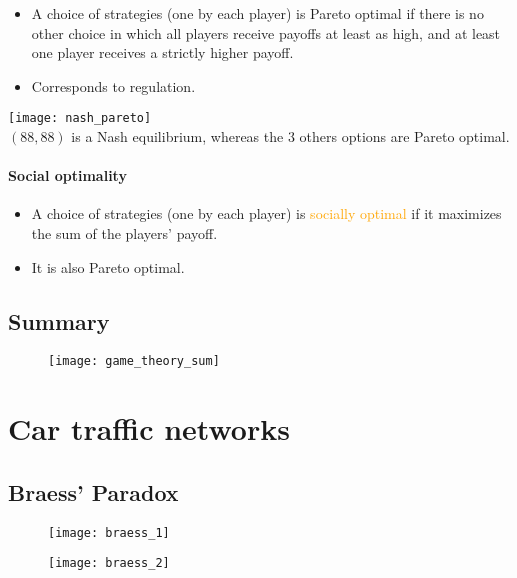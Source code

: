 \begin{itemize}
\item A choice of strategies (one by each player) is Pareto optimal if there is no other choice in which all players receive payoffs at least as high, and at least one player receives a strictly higher payoff.
\item Corresponds to regulation.
\end{itemize}

\begin{table}[H]
    \centering
    \texttt{[image: nash\_pareto]}\\
    $(88, 88)$ is a Nash equilibrium, whereas the 3 others options are Pareto optimal.
\end{table}

\subsubsection{Social optimality}

\begin{itemize}
\item A choice of strategies (one by each player) is \textcolor{orange}{socially optimal} if it maximizes the sum of the players' payoff.
\item It is also Pareto optimal.
\end{itemize}

\section{Summary}

\begin{figure}[H]
    \centering
    \texttt{[image: game\_theory\_sum]}
\end{figure}

\chapter{Car traffic networks}

\section{Braess' Paradox}

\begin{figure}[H]
    \centering
    \texttt{[image: braess\_1]}
\end{figure}

\begin{figure}[H]
    \centering
    \texttt{[image: braess\_2]}
\end{figure}

